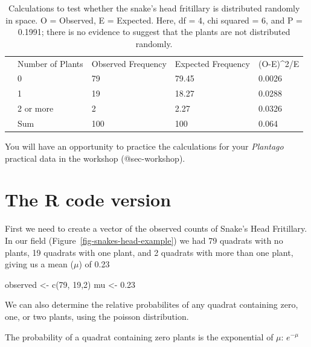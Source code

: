 \documentclass[
  letterpaper,
  DIV=11,
  numbers=noendperiod]{scrreprt}
\newenvironment{Shaded}{\begin{snugshade}}{\end{snugshade}}
\newcommand{\DecValTok}[1]{\textcolor[rgb]{0.68,0.00,0.00}{#1}}
\newcommand{\FloatTok}[1]{\textcolor[rgb]{0.68,0.00,0.00}{#1}}
\newcommand{\FunctionTok}[1]{\textcolor[rgb]{0.28,0.35,0.67}{#1}}
\newcommand{\NormalTok}[1]{\textcolor[rgb]{0.00,0.23,0.31}{#1}}
\newcommand{\OtherTok}[1]{\textcolor[rgb]{0.00,0.23,0.31}{#1}}
\begin{document}
\begin{longtable}[t]{lllll}

\caption{\label{tbl-snakes-head}Calculations to test whether the snake's
head fritillary is distributed randomly in space. O = Observed, E =
Expected. Here, df = 4, chi squared = 6, and P = 0.1991; there is no
evidence to suggest that the plants are not distributed randomly.}

\tabularnewline

\\
\toprule
 & Number of Plants & Observed Frequency & Expected Frequency & (O-E)\textasciicircum{}2/E\\
\midrule
 & 0 & 79 & 79.45 & 0.0026\\
 & 1 & 19 & 18.27 & 0.0288\\
 & 2 or more & 2 & 2.27 & 0.0326\\
 & Sum & 100 & 100 & 0.064\\
\bottomrule

\end{longtable}

You will have an opportunity to practice the calculations for your
\emph{Plantago} practical data in the workshop (@sec-workshop).

\section{The R code version}\label{the-r-code-version}

First we need to create a vector of the observed counts of Snake's Head
Fritillary. In our field (Figure~\ref{fig-snakes-head-example}) we had
79 quadrats with no plants, 19 quadrats with one plant, and 2 quadrats
with more than one plant, giving us a mean (\(\mu\)) of 0.23

\begin{Shaded}
\begin{Highlighting}[]
\NormalTok{observed }\OtherTok{\textless{}{-}} \FunctionTok{c}\NormalTok{(}\DecValTok{79}\NormalTok{, }\DecValTok{19}\NormalTok{,}\DecValTok{2}\NormalTok{)}
\NormalTok{mu }\OtherTok{\textless{}{-}} \FloatTok{0.23}
\end{Highlighting}
\end{Shaded}

We can also determine the relative probabilites of any quadrat
containing zero, one, or two plants, using the poisson distribution.

The probability of a quadrat containing zero plants is the exponential
of \(\mu\): \(e^{-\mu}\)
\end{document}
